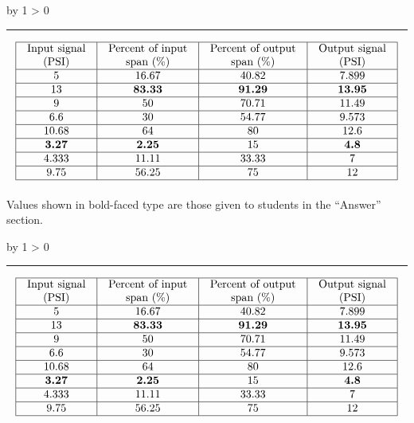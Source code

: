 \documentclass[12pt,a4paper]{article}
\def\svar{
           \advance\answnum by 1
           \ifnum \answnum > 0
                \hrule
                \vskip 3pt
                \leftline{Svar \the\answnum}
                \vskip 3pt \fi}
\def\notes{
           \advance\explnum by 1
           \ifnum \explnum > 0
                \hrule
                \vskip 3pt
                \leftline{Notes \the\explnum}
                \vskip 3pt \fi}
\begin{document}
\vskip 10pt \filbreak 





\svar{} 

$$\vbox{\offinterlineskip
\halign{\strut
\vrule \quad\hfil # \ \hfil & 
\vrule \quad\hfil # \ \hfil & 
\vrule \quad\hfil # \ \hfil & 
\vrule \quad\hfil # \ \hfil \vrule \cr
\noalign{\hrule}
%
Input signal & Percent of input & Percent of output & Output signal \cr
%
(PSI) & span (\%) & span (\%) & (PSI) \cr
%
\noalign{\hrule}
%
5 & 16.67 & 40.82 & 7.899 \cr
%
\noalign{\hrule}
%
13 & {\bf 83.33} & {\bf 91.29} & {\bf 13.95} \cr
%
\noalign{\hrule}
%
9 & 50 & 70.71 & 11.49 \cr
%
\noalign{\hrule}
%
6.6 & 30 & 54.77 & 9.573 \cr
%
\noalign{\hrule}
%
10.68 & 64 & 80 & 12.6 \cr
%
\noalign{\hrule}
%
{\bf 3.27} & {\bf 2.25} & 15 & {\bf 4.8} \cr
%
\noalign{\hrule}
%
4.333 & 11.11 & 33.33 & 7 \cr
%
\noalign{\hrule}
%
9.75 & 56.25 & 75 & 12 \cr
%
\noalign{\hrule}
} %
}$$ %

Values shown in bold-faced type are those given to students in the ``Answer'' section.
\noindent


\vskip 10pt \filbreak 





\notes{} 


$$\vbox{\offinterlineskip
\halign{\strut
\vrule \quad\hfil # \ \hfil & 
\vrule \quad\hfil # \ \hfil & 
\vrule \quad\hfil # \ \hfil & 
\vrule \quad\hfil # \ \hfil \vrule \cr
\noalign{\hrule}
%
Input signal & Percent of input & Percent of output & Output signal \cr
%
(PSI) & span (\%) & span (\%) & (PSI) \cr
%
\noalign{\hrule}
%
5 & 16.67 & 40.82 & 7.899 \cr
%
\noalign{\hrule}
%
13 & {\bf 83.33} & {\bf 91.29} & {\bf 13.95} \cr
%
\noalign{\hrule}
%
9 & 50 & 70.71 & 11.49 \cr
%
\noalign{\hrule}
%
6.6 & 30 & 54.77 & 9.573 \cr
%
\noalign{\hrule}
%
10.68 & 64 & 80 & 12.6 \cr
%
\noalign{\hrule}
%
{\bf 3.27} & {\bf 2.25} & 15 & {\bf 4.8} \cr
%
\noalign{\hrule}
%
4.333 & 11.11 & 33.33 & 7 \cr
%
\noalign{\hrule}
%
9.75 & 56.25 & 75 & 12 \cr
%
\noalign{\hrule}
} %
}$$ %
\end{document}
